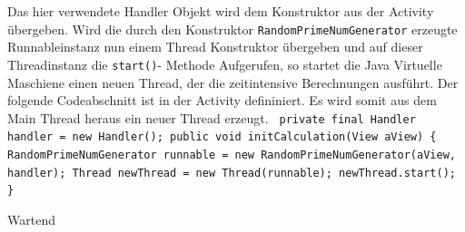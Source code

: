 \documentclass[12pt,oneside,a4paper,bibtotoc,liststotoc]{scrreprt}
\begin{document}
Das hier verwendete Handler Objekt wird dem Konstruktor aus der Activity übergeben. Wird die durch den Konstruktor \texttt{RandomPrimeNumGenerator} erzeugte Runnableinstanz nun einem Thread Konstruktor übergeben und auf dieser Threadinstanz die \texttt{start()}- Methode Aufgerufen, so startet die Java Virtuelle Maschiene einen neuen Thread, der die zeitintensive Berechnungen ausführt. Der folgende Codeabschnitt ist in der Activity defininiert. Es wird somit aus dem Main Thread heraus ein neuer Thread erzeugt.\newline\newline\newline
\texttt{
private final Handler handler = new Handler();\newline\newline
public void initCalculation(View aView)\newline
  \{ \newline
     RandomPrimeNumGenerator runnable =
        new RandomPrimeNumGenerator(aView, handler);\newline\newline  
     Thread newThread = new Thread(runnable);\newline
     newThread.start();\newline
  \} \newline
} \newline

\glqq Wartend\grqq
\end{document}
